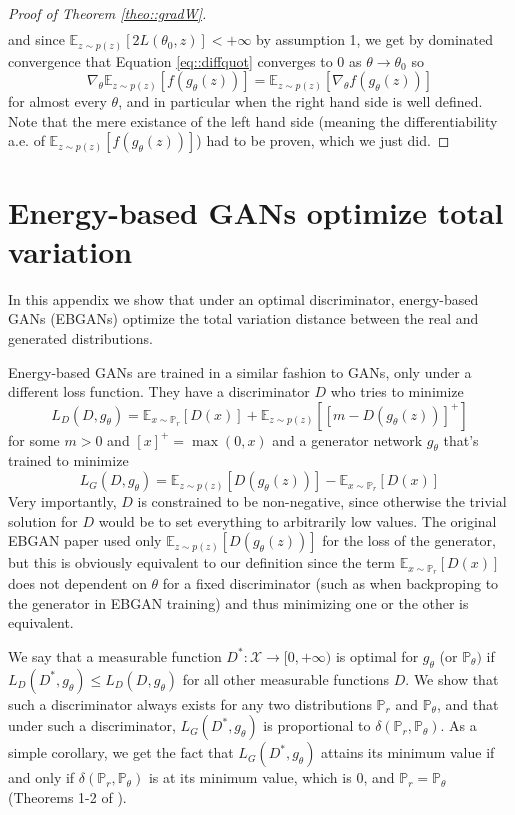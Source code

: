 \documentclass{article} %
\newcommand\EE{\mathbb{E}}
\newcommand\PP{\mathbb{P}}
\theoremstyle{definition}
\theoremstyle{definition}
\begin{document}
\begin{appendices}
\begin{proof}[Proof of Theorem \autoref{theo::gradW}]
\begin{multline*}
  \end{multline*}
  and since $\EE_{z \sim p(z)}[2 L(\theta_0, z)] < +\infty$ by assumption 1,
  we get by dominated convergence that Equation \ref{eq::diffquot} converges
  to 0 as $\theta \to \theta_0$ so
  $$ \nabla_\theta
  \EE_{z \sim p(z)} [f(g_\theta(z))] = \EE_{z \sim p(z)} [\nabla_\theta f(g_\theta(z))]
  $$
  for almost every $\theta$, and in particular when the right
  hand side is well defined.
  Note that the mere existance of the left
  hand side (meaning the differentiability a.e. of $\EE_{z \sim p(z)}
  [f(g_\theta(z))]$) had to be proven, which we just did.
\end{proof}

\clearpage
\section{Energy-based GANs optimize total variation} \label{app::ebgan}
In this appendix we show that under an optimal discriminator,
energy-based GANs (EBGANs) \cite{Zhao-ea-EBGAN} optimize the total variation
distance between the real and generated distributions.

Energy-based GANs are trained in a similar fashion to GANs, only under
a different loss function. They have a discriminator $D$ who tries to
minimize 
\begin{equation*}
L_D(D, g_\theta) = \EE_{x \sim \PP_r}[D(x)] + \EE_{z \sim p(z)}[[m - D(g_\theta(z))]^+]
\end{equation*}
for some $m > 0$ and $[x]^+ = \max(0, x)$ and a generator network $g_\theta$ that's trained to minimize
\begin{equation*}
L_G(D, g_\theta) = \EE_{z \sim p(z)} [D(g_\theta(z))] - \EE_{x \sim \PP_r}[D(x)]
\end{equation*}
Very importantly, $D$ is constrained to be non-negative,
since otherwise the trivial solution for $D$ would be to set everything to
arbitrarily low values. The original EBGAN paper used only $\EE_{z \sim p(z)}[D(g_\theta(z))]$ for
the loss of the generator, but this is obviously equivalent to our
definition since the term $\EE_{x \sim \PP_r}[D(x)]$ does not dependent
on $\theta$ for a fixed discriminator (such as when backproping to the
generator in EBGAN
training) and thus minimizing one or the other is equivalent.

We say that a measurable function $D^*: \mathcal{X} \rightarrow [0, +\infty)$
is optimal for $g_\theta$ (or $\PP_\theta)$ if $L_D(D^*, g_\theta) \leq L_D(D, g_\theta)$ for all
other measurable functions $D$. We show that such a discriminator
always exists for any two distributions $\PP_r$ and $\PP_\theta$,
and that under such a discriminator, $L_G(D^*, g_\theta)$ is
proportional to $\delta(\PP_r, \PP_\theta)$. As a simple corollary,
we get the fact that $L_G(D^*, g_\theta)$ attains its minimum
value if and only if $\delta(\PP_r, \PP_\theta)$ is at its
minimum value, which is 0, and $\PP_r = \PP_\theta$
(Theorems 1-2 of \cite{Zhao-ea-EBGAN}).


\end{appendices}
\end{document}
